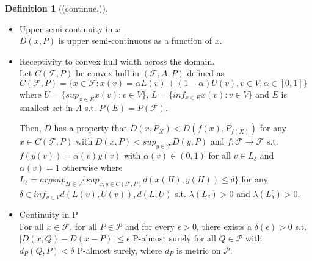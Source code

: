 \documentclass[aspectratio=169,ignorenonframetext,9pt]{beamer}
\theoremstyle{plain}
\theoremstyle{definition}
\newtheorem{defn}{Definition}[section]
\begin{document}
\begin{frame}
    \begin{defn}[(continue.)]
        \begin{itemize}
        \item Upper semi-continuity in $x$ \\
            $D(x,P)$ is upper semi-continuous as a function of $x$.
        \item Receptivity to convex hull width across the domain. \\
            Let $C(\mathcal{F},P)$ be convex hull in $(\mathcal{F},A,P)$ defined as
            \(C(\mathcal{F},P)=\{x\in\mathcal{F} : x(v)=\alpha L(v)+ (1-\alpha)U(v), v\in V, \alpha\in[0,1]\}\)
            where $U=\{sup_{x\in E}x(v):v\in V\}$, $L=\{inf_{x\in E}x(v):v\in V\}$
            and $E$ is smallest set in $A$ s.t. $P(E)=P(\mathcal{F})$.

            Then, $D$ has a property that $D(x,P_X)<D(f(x),P_{f(X)})$ for any $x\in C(\mathcal{F},P)$
            with $D(x,P)<sup_{y\in\mathcal{F}}D(y,P)$ and $f:\mathcal{F}\rightarrow\mathcal{F}$
            s.t. $f(y(v))=\alpha(v)y(v)$ with $\alpha(v)\in(0,1)$ for all $v\in L_{\delta}$ and $\alpha(v)=1$  otherwise
            where \(L_\delta = argsup_{H\in V} \{sup_{x,y\in C(\mathcal{F},P)} d(x(H),y(H)) \leq \delta\}\)
            for any $\delta\in inf_{v\in V}d(L(v),U(v)), d(L,U)$ s.t. $\lambda(L_\delta)>0$ and $\lambda(L_\delta^c)>0$.
        \item Continuity in P \\ 
            For all $x\in\mathcal{F}$, for all $P \in \mathcal{P}$ and for every $\epsilon>0$,
            there exists a $\delta(\epsilon)>0$ s.t. $|D(x,Q)-D(x-P)|\leq\epsilon$ P-almost surely for all $Q\in\mathcal{P}$ with
            $d_P(Q,P)<\delta$ P-almost surely, where $d_P$ is metric on $\mathcal{P}$.
        \end{itemize}
    \end{defn}
\end{frame}
\end{document}
